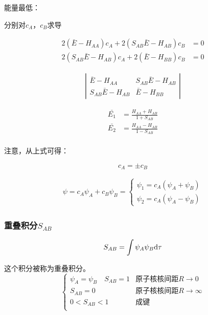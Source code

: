 能量最低：

分别对$c_A$，$c_B$求导


\begin{align*}
    2 \left(  \bar{E} - H_{AA}  \right)c_A + 2 \left( S_{AB} \bar{E} - H_{AB}  \right)c_B &= 0 \\
    2 \left(  S_{AB}\bar{E} - H_{AB} \right)c_A + 2 \left( \bar{E} - H_{BB}  \right)c_B &= 0
\end{align*}


\begin{align*}
    \left| \begin{array}{cc}
        \bar{E} - H_{AA} & S_{AB} \bar{E} - H_{AB} \\ 
        S_{AB} \bar{E} - H_{AB} & \bar{E} - H_{BB} 
    \end{array} \right|
\end{align*}

\begin{align*}
    \bar{E_1} &= \frac{H_{AA} + H_{AB}}{1 + S_{AB}} \\
    \bar{E_2} &= \frac{H_{AA} - H_{AB}}{1 - S_{AB}} \\
\end{align*}

注意，从上式可得：

\begin{equation*}
    c_A = \pm c_B
\end{equation*}

\begin{align*}
    \psi = c_A \psi_A + c_B \psi_B = \begin{cases}
        \psi_1 = c_A(\psi_A + \psi_B) \\
        \psi_2 = c_A(\psi_A - \psi_B)
    \end{cases}
\end{align*}



\subsubsection{重叠积分$S_{AB}$}

\begin{equation*}
    S_{AB} = \int \psi_A \psi_B \mathrm{d} \tau
\end{equation*}

这个积分被称为重叠积分。
\begin{equation*}
    \begin{cases}
    \psi_A = \psi_B \quad S_{AB} = 1 & \mbox{原子核核间距} R \to 0 \\
    S_{AB} = 0 & \mbox{原子核核间距} R \to \infty \\
    0 < S_{AB} < 1 & \mbox{成键} \\
    \end{cases}
\end{equation*}

